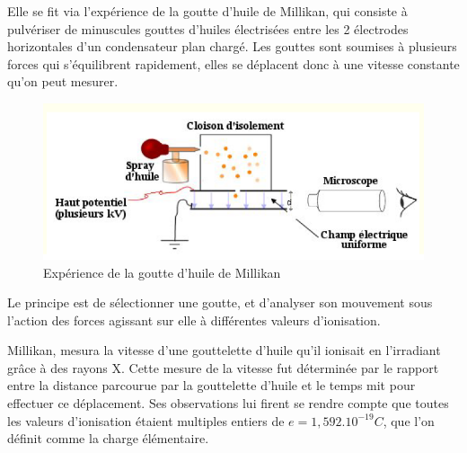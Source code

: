 Elle se fit via l'expérience de la goutte d'huile de Millikan, qui consiste à pulvériser de minuscules gouttes d'huiles électrisées entre les 2 électrodes horizontales d'un condensateur plan chargé. Les gouttes sont soumises à plusieurs forces qui s'équilibrent rapidement, elles se déplacent donc à une vitesse constante qu'on peut mesurer. 

\begin{figure}[ht]
\centering
\includegraphics[scale=0.60]{Images1/millikan.PNG}
\caption{Expérience de la goutte d'huile de Millikan}
\end{figure}

Le principe est de sélectionner une goutte, et  d'analyser son mouvement sous l'action des forces agissant sur elle  à différentes valeurs d'ionisation.

Millikan, mesura la vitesse d'une gouttelette d'huile qu'il ionisait en l'irradiant grâce à des rayons X. Cette mesure de la vitesse fut déterminée par le rapport entre la distance parcourue par la gouttelette d'huile et le temps mit pour effectuer ce déplacement. Ses observations lui firent se rendre compte que toutes les valeurs d'ionisation étaient multiples entiers de $e=1,592.10^{-19}C$, que l'on définit comme la charge élémentaire.

